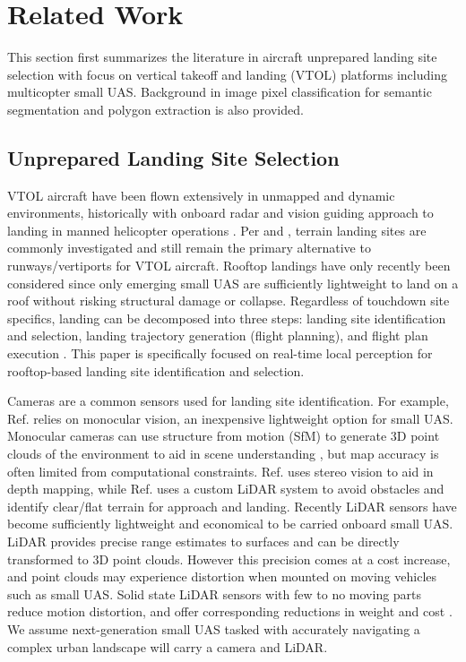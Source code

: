 \section{Related Work}\label{sec:ch6_related_work}

This section first summarizes the literature in aircraft unprepared landing site selection with focus on vertical takeoff and landing (VTOL) platforms including multicopter small UAS.  Background in image pixel classification for semantic segmentation and polygon extraction is also provided. 

\subsection{Unprepared Landing Site Selection}\label{sec:ch6_related_landing}

VTOL aircraft have been flown extensively in unmapped and dynamic environments, historically with onboard radar and vision guiding approach to landing in manned helicopter operations \cite{scherer_autonomous_2012}. Per  \cite{jin_-board_2016} and \cite{desaraju_vision-based_2015}, terrain landing sites are commonly investigated and still remain the primary alternative to runways/vertiports for VTOL aircraft.  Rooftop landings have only recently been considered \cite{desaraju_vision-based_2015, castagno_comprehensive_2018, castagno_map-based_2021} since only emerging small UAS are sufficiently lightweight to land on a roof without risking structural damage or collapse.    Regardless of touchdown site specifics, landing can be decomposed into three steps: landing site identification and selection, landing trajectory generation (flight planning), and flight plan execution \cite{atkins_emergency_2006, dotenco_autonomous_2015}. This paper is specifically focused on real-time local perception for rooftop-based landing site identification and selection.

Cameras are a common sensors used for landing site identification.  For example, Ref. \cite{jin_-board_2016} relies on monocular vision, an inexpensive lightweight option for small UAS. Monocular cameras can use structure from motion (SfM) to generate 3D point clouds of the environment to aid in scene understanding \cite{schonberger_structure--motion_2016}, but map accuracy is often limited from computational constraints.  Ref. \cite{desaraju_vision-based_2015} uses stereo vision to aid in depth mapping, while Ref. \cite{whalley2009field} uses a custom LiDAR system to avoid obstacles and identify clear/flat terrain for approach and landing.  Recently  LiDAR sensors have become sufficiently lightweight and economical to be carried onboard small UAS.  LiDAR provides precise range estimates to surfaces and can be directly transformed to 3D point clouds.  However this precision comes at a cost increase, and point clouds may experience distortion when mounted on moving vehicles such as small UAS.  Solid state LiDAR sensors with few to no moving parts reduce motion distortion, and offer corresponding reductions in weight and cost \cite{wei_enhancing_2021, nam_solid-state_2021, nxp:tja1043}.  We assume next-generation small UAS tasked with accurately navigating a complex urban landscape will carry a camera and LiDAR. 

